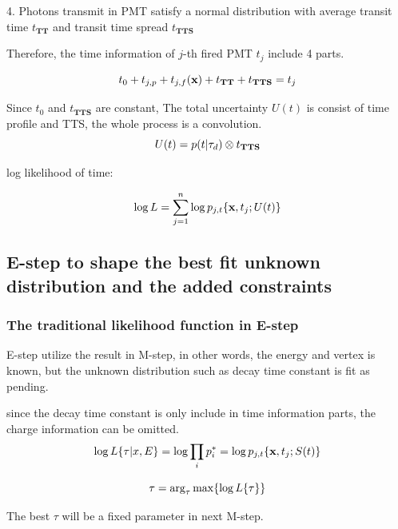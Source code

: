 \documentclass{article}
\begin{document}
	\par 4. Photons transmit in PMT satisfy a normal distribution with average transit time $t_{\textbf{TT}}$ and transit time spread $t_{\textbf{TTS}}$

	Therefore, the time information of $j$-th fired PMT $t_j$ include 4 parts. 

	\begin{equation}
	\numberwithin{equation}{section}
	t_{0} + t_{j,p} + t_{j,f}({\textbf x}) +  t_{\textbf{TT}} + t_{\textbf{TTS}}= t_{j} 
	\end{equation}	
	
	\par Since $t_{0}$ and $t_{\textbf{TTS}}$ are constant, The total uncertainty $U(t)$ is consist of time profile and TTS, the whole process is a convolution.
	\begin{equation}
	\numberwithin{equation}{section}
		U(t) =  p(t|\tau_d)\otimes t_{\textbf{TTS}}
	\end{equation}

	\par log likelihood of time:

	\begin{equation}
		\numberwithin{equation}{section}
		\log L = \sum_{j=1}^n \log p_{j,t}\{{\textbf x},t_{j};U(t)\}
	\end{equation}

\subsection{E-step to shape the best fit unknown distribution and the added constraints}
\subsubsection{The traditional likelihood function in E-step}
\par E-step utilize the result in M-step, in other words, the energy and vertex is known, but the unknown distribution such as decay time constant is fit as pending.
\par since the decay time constant is only include in time information parts, the charge information can be omitted.
	\begin{equation}
	\numberwithin{equation}{section}
		\log L\{\tau|x,E\} = \log \prod_{i} p^*_i = \log p_{j,t}\{{\textbf x},t_{j};S(t)\}
	\end{equation}

	\begin{equation}
	\numberwithin{equation}{section}
		\tau = \arg_\tau{\max\{\log L\{\tau\}\}}
	\end{equation}
\par The best $\tau$ will be a fixed parameter in next M-step.
\end{document}
